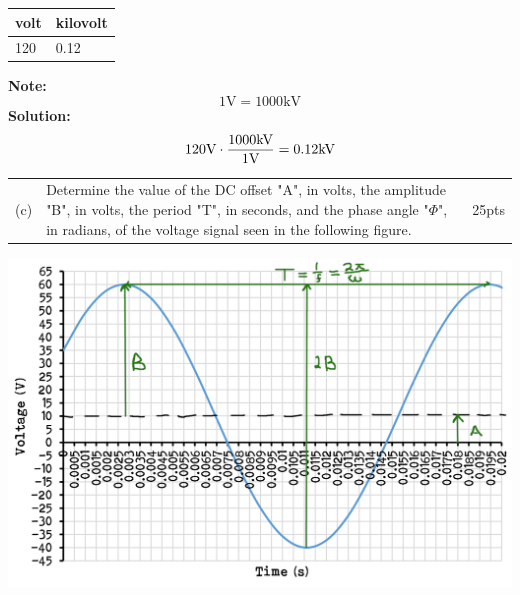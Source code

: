 \documentclass{article}
\newcommand{\problemstatement}[3]{
\noindent
\begin{tabular}{ m{0.5cm} m{42em} m{0.5cm} }
	({#1}) & {#2} & {#3}pts
\end{tabular}
}
\begin{document}
\begin{center}
	\begin{tabular}{ | w{c}{2cm} | w{c}{2cm} | }
		\hline
		volt & kilovolt \\
		    &  0.12 \\
		\hline
	\end{tabular}
\end{center}
\begin{addmargin}[1.5cm]{0em}
	\noindent\textbf{Note:}
	\begin{equation}
		1 \text{V} = 1000 \text{kV}
	\end{equation}
	\noindent\textbf{Solution:}
	\[ 120 \text{V} \cdot { 1000 \text{kV} \over 1 \text{V} } = 0.12 \text{kV} \]
\end{addmargin}

\newpage
\problemstatement{c}{Determine the value of the DC offset "A", in volts, the amplitude "B", in volts, the period "T", in seconds, and the phase angle "$\Phi$", in radians, of the voltage signal seen in the following figure.}{25}
\includegraphics[width=\textwidth]{figure}
\end{document}
